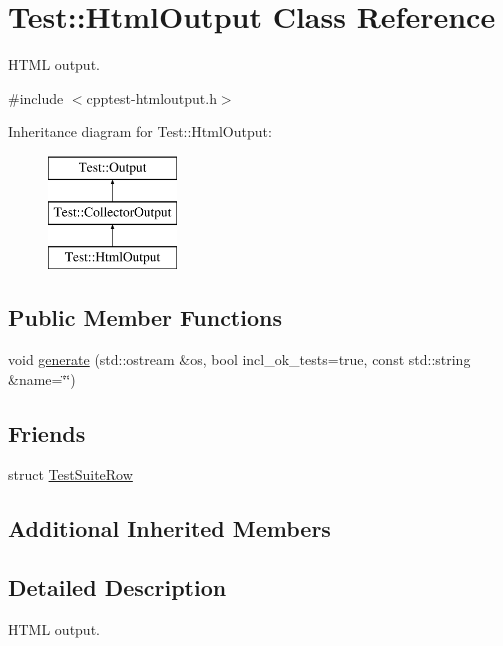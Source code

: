 \hypertarget{class_test_1_1_html_output}{}\section{Test\+:\+:Html\+Output Class Reference}
\label{class_test_1_1_html_output}


H\+T\+ML output.  




{\ttfamily \#include $<$cpptest-\/htmloutput.\+h$>$}

Inheritance diagram for Test\+:\+:Html\+Output\+:\begin{figure}[H]
\begin{center}
\leavevmode
\includegraphics[height=3.000000cm]{class_test_1_1_html_output}
\end{center}
\end{figure}
\subsection*{Public Member Functions}
\begin{DoxyCompactItemize}
\item 
void \mbox{\hyperlink{class_test_1_1_html_output_a589e4e59aee4da0f70f3f6568daaf0f0}{generate}} (std\+::ostream \&os, bool incl\+\_\+ok\+\_\+tests=true, const std\+::string \&name=\char`\"{}\char`\"{})
\end{DoxyCompactItemize}
\subsection*{Friends}
\begin{DoxyCompactItemize}
\item 
struct \mbox{\hyperlink{class_test_1_1_html_output_a1e37e043f56a53b521955598f3366682}{Test\+Suite\+Row}}
\end{DoxyCompactItemize}
\subsection*{Additional Inherited Members}


\subsection{Detailed Description}
H\+T\+ML output. 

